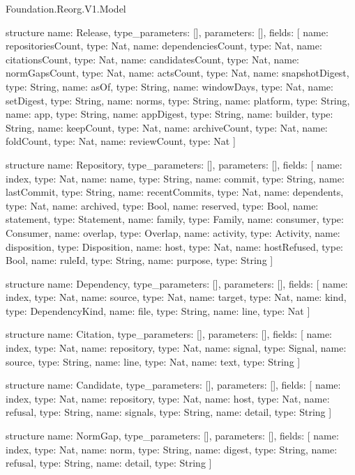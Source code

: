\begin{lexlean}{Foundation.Reorg.V1.Model}
\begin{semanticmodule}
structure{
  name: Release,
  type_parameters: [],
  parameters: [],
  fields: [
    {name: repositoriesCount, type: Nat},
    {name: dependenciesCount, type: Nat},
    {name: citationsCount, type: Nat},
    {name: candidatesCount, type: Nat},
    {name: normGapsCount, type: Nat},
    {name: actsCount, type: Nat},
    {name: snapshotDigest, type: String},
    {name: asOf, type: String},
    {name: windowDays, type: Nat},
    {name: setDigest, type: String},
    {name: norms, type: String},
    {name: platform, type: String},
    {name: app, type: String},
    {name: appDigest, type: String},
    {name: builder, type: String},
    {name: keepCount, type: Nat},
    {name: archiveCount, type: Nat},
    {name: foldCount, type: Nat},
    {name: reviewCount, type: Nat}
  ]
}

structure{
  name: Repository,
  type_parameters: [],
  parameters: [],
  fields: [
    {name: index, type: Nat},
    {name: name, type: String},
    {name: commit, type: String},
    {name: lastCommit, type: String},
    {name: recentCommits, type: Nat},
    {name: dependents, type: Nat},
    {name: archived, type: Bool},
    {name: reserved, type: Bool},
    {name: statement, type: Statement},
    {name: family, type: Family},
    {name: consumer, type: Consumer},
    {name: overlap, type: Overlap},
    {name: activity, type: Activity},
    {name: disposition, type: Disposition},
    {name: host, type: Nat},
    {name: hostRefused, type: Bool},
    {name: ruleId, type: String},
    {name: purpose, type: String}
  ]
}

structure{
  name: Dependency,
  type_parameters: [],
  parameters: [],
  fields: [
    {name: index, type: Nat},
    {name: source, type: Nat},
    {name: target, type: Nat},
    {name: kind, type: DependencyKind},
    {name: file, type: String},
    {name: line, type: Nat}
  ]
}

structure{
  name: Citation,
  type_parameters: [],
  parameters: [],
  fields: [
    {name: index, type: Nat},
    {name: repository, type: Nat},
    {name: signal, type: Signal},
    {name: source, type: String},
    {name: line, type: Nat},
    {name: text, type: String}
  ]
}

structure{
  name: Candidate,
  type_parameters: [],
  parameters: [],
  fields: [
    {name: index, type: Nat},
    {name: repository, type: Nat},
    {name: host, type: Nat},
    {name: refusal, type: String},
    {name: signals, type: String},
    {name: detail, type: String}
  ]
}

structure{
  name: NormGap,
  type_parameters: [],
  parameters: [],
  fields: [
    {name: index, type: Nat},
    {name: norm, type: String},
    {name: digest, type: String},
    {name: refusal, type: String},
    {name: detail, type: String}
  ]
}


\end{semanticmodule}
\end{lexlean}
